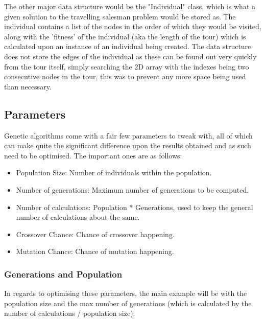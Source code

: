 \documentclass[11pt,a4paper,titlepage]{article}
\begin{document}
The other major data structure would be the "Individual" class, which is what a given solution to the travelling salesman problem would be stored as. The individual contains a list of the nodes in the order of which they would be visited, along with the 'fitness' of the individual (aka the length of the tour) which is calculated upon an instance of an individual being created. The data structure does not store the edges of the individual as these can be found out very quickly from the tour itself, simply searching the 2D array with the indexes being two consecutive nodes in the tour, this was to prevent any more space being used than necessary.

\subsection{Parameters}

Genetic algorithms come with a fair few parameters to tweak with, all of which can make quite the significant difference upon the results obtained and as such need to be optimised. The important ones are as follows:

\begin{itemize}
\item Population Size: Number of individuals within the population.
\item Number of generations: Maximum number of generations to be computed.
\item Number of calculations: Population * Generations, used to keep the general number of calculations about the same.
\item Crossover Chance: Chance of crossover happening.
\item Mutation Chance: Chance of mutation happening.
\end{itemize}

\subsubsection{Generations and Population}
In regards to optimising these parameters, the main example will be with the population size and the max number of generations (which is calculated by the number of calculations / population size).
\end{document}
